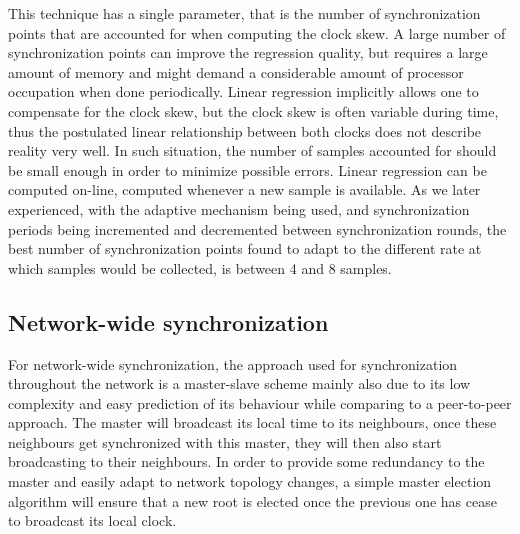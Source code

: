 This technique has a single parameter, that is the number of synchronization points that are accounted for when computing the clock skew. A large number of synchronization points can improve the regression quality, but requires a large amount of memory and might demand a considerable amount of processor occupation when done periodically. Linear regression implicitly allows one to compensate for the clock skew, but the clock skew is often variable during time, thus the postulated linear relationship between both clocks does not describe reality very well. In such situation, the number of samples accounted for should be small enough in order to minimize possible errors. Linear regression can be computed on-line, computed whenever a new sample is available. As we later experienced, with the adaptive mechanism being used, and synchronization periods being incremented and decremented between synchronization rounds, the best number of synchronization points found to adapt to the different rate at which samples would be collected, is between 4 and 8 samples.\\

\subsection{Network-wide synchronization}
For network-wide synchronization, the approach used for synchronization throughout the network is a master-slave scheme mainly also due to its low complexity and easy prediction of its behaviour while comparing to a peer-to-peer approach. The master will broadcast its local time to its neighbours, once these neighbours get synchronized with this master, they will then also start broadcasting to their neighbours.  In order to provide some redundancy to the master and easily adapt to network topology changes, a simple master election algorithm will ensure that a new root is elected once the previous one has cease to broadcast its local clock.

